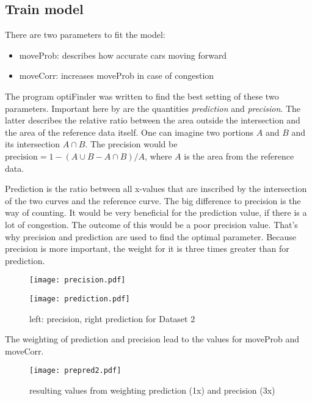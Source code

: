 \subsection{Train model}
There are two parameters to fit the model:
\begin{itemize}
\item moveProb: describes how accurate cars moving forward
\item moveCorr: increases moveProb in case of congestion
\end{itemize}

The program optiFinder was written to find the best setting of these two parameters. Important here by are the quantities \textit{prediction} and \textit{precision}.
The latter describes the relative ratio between the area outside the intersection and the area of the reference data itself. One can imagine two portions $A$ and $B$ and its intersection $A \cap B$. The precision would be $\textrm{precision} = 1 - (A \cup B - A \cap B) / A$, where $A$ is the area from the reference data.

Prediction is the ratio between all x-values that are inscribed by the intersection of the two curves and the reference curve. The big difference to precision is the way of counting. It would be very beneficial for the prediction value, if there is a lot of congestion. The outcome of this would be a poor precision value. That's why precision and prediction are used to find the optimal parameter. Because precision is more important, the weight for it is three times greater than for prediction.

\begin{figure}[H]
\begin{minipage}[t]{.5\textwidth}
\texttt{[image: precision.pdf]}
\end{minipage}
\begin{minipage}[t]{.5\textwidth}
\texttt{[image: prediction.pdf]}
\end{minipage}
\caption{left: precision, right prediction for Dataset 2}
\end{figure}

The weighting of prediction and precision lead to the values for moveProb and moveCorr.
\begin{figure}[H]\centering
\texttt{[image: prepred2.pdf]}
\caption{resulting values from weighting prediction (1x) and precision (3x)}
\end{figure}
